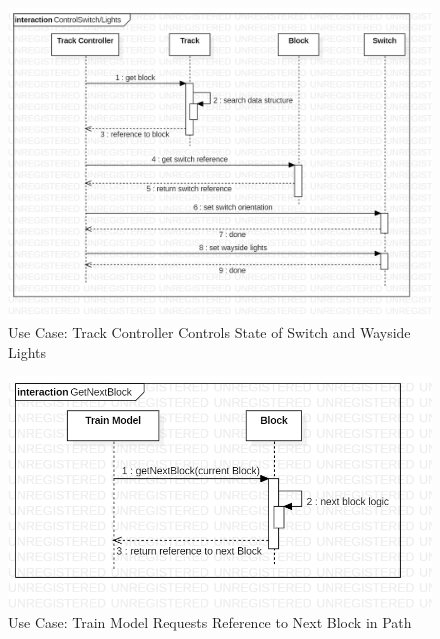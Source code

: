 \documentclass{article}
\begin{document}
    \begin{figure}[H]
        \centering
        \includegraphics[width=\textwidth]{./SequenceDiagrams/TrackModel_SeqDiagrams/TrackModel_SeqDiagram_TKCControlsSwitch+Lights.png}
        \caption{Use Case: Track Controller Controls State of Switch and Wayside Lights}
        \label{fig: Track Controller Controls Switch and Lights}
    \end{figure}
    \begin{figure}[H]
        \centering
        \includegraphics[width=\textwidth]{./SequenceDiagrams/TrackModel_SeqDiagrams/TrackModel_SeqDiagram_TNMGetNextBlock.png}
        \caption{Use Case: Train Model Requests Reference to Next Block in Path}
        \label{fig:Train Model Get Next Block}
    \end{figure}
\end{document}
